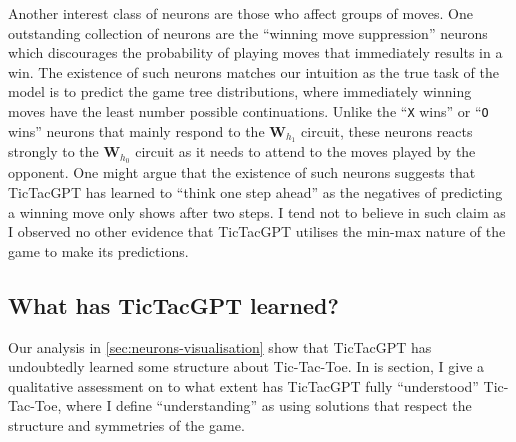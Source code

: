 \documentclass{article}
\newcommand{\ttgpt}{TicTacGPT\xspace}
\newcommand{\ttt}{Tic-Tac-Toe\xspace}
\newcommand{\m}[1]{\mathbf{\bm{#1}}}
\newcounter{num}
\begin{document}
Another interest class of neurons are those who affect groups of moves. One outstanding collection of neurons are the ``winning move suppression'' neurons which discourages the probability of playing moves that immediately results in a win. The existence of such neurons matches our intuition as the true task of the model is to predict the game tree distributions, where immediately winning moves have the least number possible continuations. Unlike the ``\texttt{X} wins'' or ``\texttt{O} wins'' neurons that mainly respond to the $\m{W}_{h_1}$ circuit, these neurons reacts strongly to the $\m{W}_{h_0}$ circuit as it needs to attend to the moves played by the opponent. One might argue that the existence of such neurons suggests that \ttgpt has learned to ``think one step ahead'' as the negatives of predicting a winning move only shows after two steps. I tend not to believe in such claim as I observed no other evidence that \ttgpt utilises the min-max nature of the game to make its predictions.




% 


\subsection{What has \ttgpt learned?}

Our analysis in \cref{sec:neurons-visualisation} show that \ttgpt has undoubtedly learned some structure about \ttt. In is section, I give a qualitative assessment on to what extent has \ttgpt fully ``understood'' \ttt, where I define ``understanding'' as using solutions that respect the structure and symmetries of the game.
\end{document}
